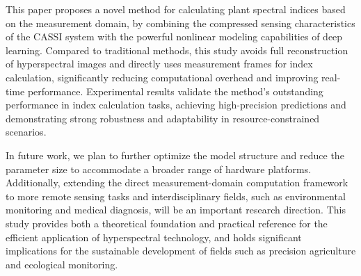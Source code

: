 \documentclass[preprint,review,12pt]{elsarticle}
\begin{document}
This paper proposes a novel method for calculating plant spectral indices based on the measurement domain, by combining the compressed sensing characteristics of the CASSI system with the powerful nonlinear modeling capabilities of deep learning. Compared to traditional methods, this study avoids full reconstruction of hyperspectral images and directly uses measurement frames for index calculation, significantly reducing computational overhead and improving real-time performance. Experimental results validate the method's outstanding performance in index calculation tasks, achieving high-precision predictions and demonstrating strong robustness and adaptability in resource-constrained scenarios.

In future work, we plan to further optimize the model structure and reduce the parameter size to accommodate a broader range of hardware platforms. Additionally, extending the direct measurement-domain computation framework to more remote sensing tasks and interdisciplinary fields, such as environmental monitoring and medical diagnosis, will be an important research direction. This study provides both a theoretical foundation and practical reference for the efficient application of hyperspectral technology, and holds significant implications for the sustainable development of fields such as precision agriculture and ecological monitoring.










\end{document}
